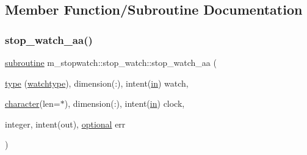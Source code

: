 \subsection{Member Function/\+Subroutine Documentation}
\mbox{\label{interfacem__stopwatch_1_1stop__watch_a5da8fbfd8a9487961ec55f42568793df}} 
\subsubsection{\texorpdfstring{stop\+\_\+watch\+\_\+aa()}{stop\_watch\_aa()}}
{\footnotesize\ttfamily \hyperlink{M__stopwatch_83_8txt_acfbcff50169d691ff02d4a123ed70482}{subroutine} m\+\_\+stopwatch\+::stop\+\_\+watch\+::stop\+\_\+watch\+\_\+aa (\begin{DoxyParamCaption}\item[{\hyperlink{stop__watch_83_8txt_a70f0ead91c32e25323c03265aa302c1c}{type} (\hyperlink{structm__stopwatch_1_1watchtype}{watchtype}), dimension(\+:), intent(\hyperlink{M__journal_83_8txt_afce72651d1eed785a2132bee863b2f38}{in})}]{watch,  }\item[{\hyperlink{option__stopwatch_83_8txt_abd4b21fbbd175834027b5224bfe97e66}{character}(len=$\ast$), dimension(\+:), intent(\hyperlink{M__journal_83_8txt_afce72651d1eed785a2132bee863b2f38}{in})}]{clock,  }\item[{integer, intent(out), \hyperlink{option__stopwatch_83_8txt_aa4ece75e7acf58a4843f70fe18c3ade5}{optional}}]{err }\end{DoxyParamCaption})\hspace{0.3cm}{\ttfamily [private]}}

\mbox{\label{interfacem__stopwatch_1_1stop__watch_a85fe87e33db92b337c128d94e160c2ab}} 
